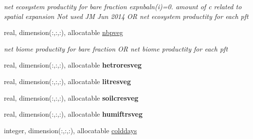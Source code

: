 \begin{DoxyCompactItemize}
\begin{DoxyCompactList}\small\item\em net ecosystem productity for bare fraction expnbaln(i)=0. amount of c related to spatial expansion Not used J\+M Jun 2014 O\+R net ecosystem productity for each pft \end{DoxyCompactList}\item 
\hypertarget{structctem__statevars_1_1veg__rot_a9dedd91b3c3052ae9bbba7d9e4e609f2}{}real, dimension(\+:,\+:,\+:), allocatable \hyperlink{structctem__statevars_1_1veg__rot_a9dedd91b3c3052ae9bbba7d9e4e609f2}{nbpveg}\label{structctem__statevars_1_1veg__rot_a9dedd91b3c3052ae9bbba7d9e4e609f2}

\begin{DoxyCompactList}\small\item\em net biome productity for bare fraction O\+R net biome productity for each pft \end{DoxyCompactList}\item 
\hypertarget{structctem__statevars_1_1veg__rot_aecce9dae8675c2a2ce7f11083a605b43}{}real, dimension(\+:,\+:,\+:), allocatable {\bfseries hetroresveg}\label{structctem__statevars_1_1veg__rot_aecce9dae8675c2a2ce7f11083a605b43}

\item 
\hypertarget{structctem__statevars_1_1veg__rot_acba23d37978c286053c300284860e2e1}{}real, dimension(\+:,\+:,\+:), allocatable {\bfseries litresveg}\label{structctem__statevars_1_1veg__rot_acba23d37978c286053c300284860e2e1}

\item 
\hypertarget{structctem__statevars_1_1veg__rot_a1a70f3ea4ed92c898b82529321a628da}{}real, dimension(\+:,\+:,\+:), allocatable {\bfseries soilcresveg}\label{structctem__statevars_1_1veg__rot_a1a70f3ea4ed92c898b82529321a628da}

\item 
\hypertarget{structctem__statevars_1_1veg__rot_a569cb77a93067d5870e321e69ca763b6}{}real, dimension(\+:,\+:,\+:), allocatable {\bfseries humiftrsveg}\label{structctem__statevars_1_1veg__rot_a569cb77a93067d5870e321e69ca763b6}

\item 
\hypertarget{structctem__statevars_1_1veg__rot_a0c46eb1ced21c8425e5400a9090a7ae2}{}integer, dimension(\+:,\+:,\+:), allocatable \hyperlink{structctem__statevars_1_1veg__rot_a0c46eb1ced21c8425e5400a9090a7ae2}{colddays}\label{structctem__statevars_1_1veg__rot_a0c46eb1ced21c8425e5400a9090a7ae2}


\end{DoxyCompactItemize}
